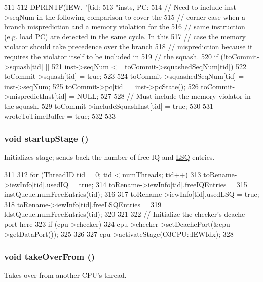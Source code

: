 \begin{DoxyCode}
511 {
512     DPRINTF(IEW, "[tid:%
513             "insts, PC: %
514     // Need to include inst->seqNum in the following comparison to cover the
515     // corner case when a branch misprediction and a memory violation for the
516     // same instruction (e.g. load PC) are detected in the same cycle.  In this
517     // case the memory violator should take precedence over the branch
518     // misprediction because it requires the violator itself to be included in
519     // the squash.
520     if (!toCommit->squash[tid] ||
521             inst->seqNum <= toCommit->squashedSeqNum[tid]) {
522         toCommit->squash[tid] = true;
523 
524         toCommit->squashedSeqNum[tid] = inst->seqNum;
525         toCommit->pc[tid] = inst->pcState();
526         toCommit->mispredictInst[tid] = NULL;
527 
528         // Must include the memory violator in the squash.
529         toCommit->includeSquashInst[tid] = true;
530 
531         wroteToTimeBuffer = true;
532     }
533 }
\end{DoxyCode}
\hypertarget{classDefaultIEW_a31d4cbdab16d4ff8d6bc7f84ece727da}{
\subsubsection[{startupStage}]{\setlength{\rightskip}{0pt plus 5cm}void startupStage ()}}
\label{classDefaultIEW_a31d4cbdab16d4ff8d6bc7f84ece727da}
Initializes stage; sends back the number of free IQ and \hyperlink{classLSQ}{LSQ} entries. 


\begin{DoxyCode}
311 {
312     for (ThreadID tid = 0; tid < numThreads; tid++) {
313         toRename->iewInfo[tid].usedIQ = true;
314         toRename->iewInfo[tid].freeIQEntries =
315             instQueue.numFreeEntries(tid);
316 
317         toRename->iewInfo[tid].usedLSQ = true;
318         toRename->iewInfo[tid].freeLSQEntries =
319             ldstQueue.numFreeEntries(tid);
320     }
321 
322     // Initialize the checker's dcache port here
323     if (cpu->checker) {
324         cpu->checker->setDcachePort(&cpu->getDataPort());
325     }
326 
327     cpu->activateStage(O3CPU::IEWIdx);
328 }
\end{DoxyCode}
\hypertarget{classDefaultIEW_a8674059ce345e23aac5086b2c3e24a43}{
\subsubsection[{takeOverFrom}]{\setlength{\rightskip}{0pt plus 5cm}void takeOverFrom ()}}
\label{classDefaultIEW_a8674059ce345e23aac5086b2c3e24a43}
Takes over from another CPU's thread. 


